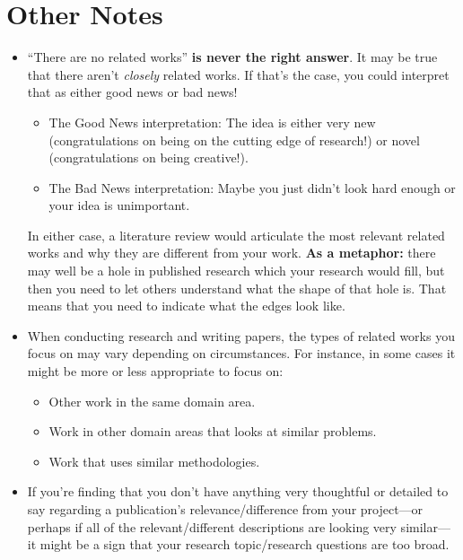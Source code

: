 \documentclass{article}
\begin{document}
\section{Other Notes}
\begin{itemize}
    \item ``There are no related works'' \textbf{is never the right answer}. It may be true that there aren't \textit{closely} related works. If that's the case, you could interpret that as either good news or bad news!
    \begin{itemize}
        \item The Good News interpretation: The idea is either very new (congratulations on being on the cutting edge of research!) or novel (congratulations on being creative!).
        \item The Bad News interpretation: Maybe you just didn't look hard enough or your idea is unimportant. \Laughey[1.4]
    \end{itemize}
    In either case, a literature review would articulate the most relevant related works and why they are different from your work. \textbf{As a metaphor: }there may well be a hole in published research which your research would fill, but then you need to let others understand what the shape of that hole is. That means that you need to indicate what the edges look like.
    
    \item When conducting research and writing papers, the types of related works you focus on may vary depending on circumstances. For instance, in some cases it might be more or less appropriate to focus on:
    \begin{itemize}
        \item Other work in the same domain area.
        \item Work in other domain areas that looks at similar problems.
        \item Work that uses similar methodologies.
    \end{itemize}
    
    \item If you're finding that you don't have anything very thoughtful or detailed to say regarding a publication's relevance/difference from your project---or perhaps if all of the relevant/different descriptions are looking very similar---it might be a sign that your research topic/research questions are too broad.
    
\end{itemize}
\end{document}
